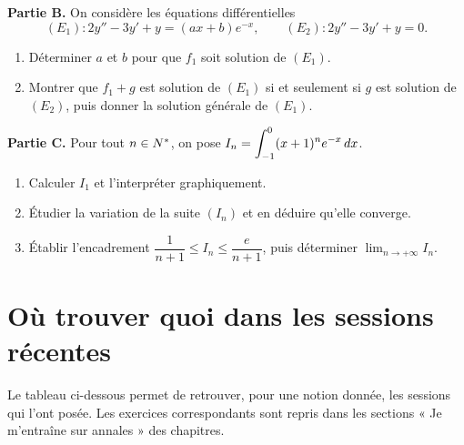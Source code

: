 \medskip
\textbf{Partie B.} On considère les équations différentielles
\[
  (E_{1}) : 2y''-3y'+y = (ax+b)e^{-x},
  \qquad
  (E_{2}) : 2y''-3y'+y = 0 .
\]
\begin{enumerate}[label=\textbf{\arabic*.}, leftmargin=*, itemsep=0.2em, start=5]
  \item Déterminer $a$ et $b$ pour que $f_{1}$ soit solution de $(E_{1})$.
  \item Montrer que $f_{1}+g$ est solution de $(E_{1})$ si et seulement si
        $g$ est solution de $(E_{2})$, puis donner la solution générale de
        $(E_{1})$.
\end{enumerate}

\medskip
\textbf{Partie C.} Pour tout $n \in N^{*}$, on pose
$\displaystyle I_{n} = \int_{-1}^{0}(x+1)^{n}e^{-x}\,dx$.
\begin{enumerate}[label=\textbf{\arabic*.}, leftmargin=*, itemsep=0.2em, start=7]
  \item Calculer $I_{1}$ et l'interpréter graphiquement.
  \item Étudier la variation de la suite $(I_{n})$ et en déduire qu'elle
        converge.
  \item Établir l'encadrement
        $\dfrac{1}{n+1} \leq I_{n} \leq \dfrac{e}{n+1}$, puis déterminer
        $\lim_{n\to+\infty}I_{n}$.
\end{enumerate}

\section*{Où trouver quoi dans les sessions récentes}

Le tableau ci-dessous permet de retrouver, pour une notion donnée, les
sessions qui l'ont posée. Les exercices correspondants sont repris dans les
sections « Je m'entraîne sur annales » des chapitres.

